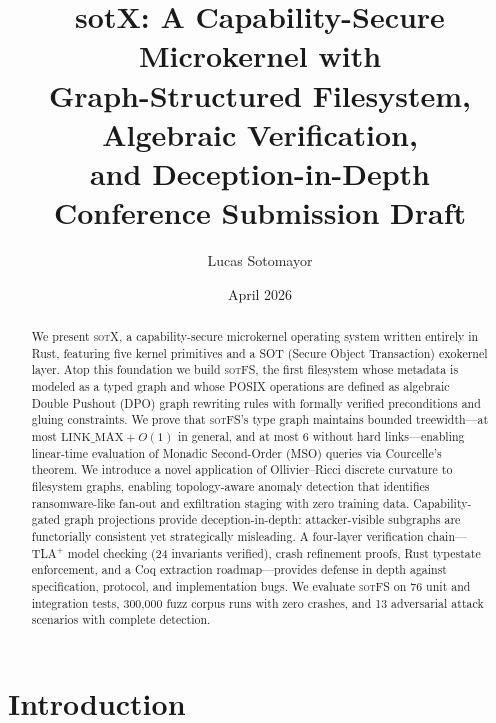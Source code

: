 \documentclass[11pt,a4paper]{article}
\title{
  \vspace{-1.5cm}
  \textbf{sotX}: A Capability-Secure Microkernel with \\
  Graph-Structured Filesystem, Algebraic Verification, \\
  and Deception-in-Depth \\[0.6em]
  \normalsize Conference Submission Draft
}
\author{
  Lucas Sotomayor
}
\date{April 2026}
\theoremstyle{definition}
\theoremstyle{remark}
\newcommand{\sotfs}{\textsc{sotFS}}
\newcommand{\sotx}{\textsc{sotX}}
\begin{document}

\maketitle
\thispagestyle{empty}

\begin{abstract}
\noindent
We present \sotx{}, a capability-secure microkernel operating system
written entirely in Rust, featuring five kernel primitives and a
SOT (Secure Object Transaction) exokernel layer. Atop this foundation
we build \sotfs{}, the first filesystem whose metadata is modeled as a
typed graph and whose POSIX operations are defined as algebraic
Double Pushout (DPO) graph rewriting rules with formally verified
preconditions and gluing constraints. We prove that \sotfs{}'s type
graph maintains bounded treewidth---at most $\mathrm{LINK\_MAX} + O(1)$
in general, and at most 6 without hard links---enabling linear-time
evaluation of Monadic Second-Order (MSO) queries via Courcelle's
theorem. We introduce a novel application of Ollivier--Ricci discrete
curvature to filesystem graphs, enabling topology-aware anomaly
detection that identifies ransomware-like fan-out and exfiltration
staging with zero training data. Capability-gated graph projections
provide deception-in-depth: attacker-visible subgraphs are functorially
consistent yet strategically misleading. A four-layer verification
chain---TLA$^+$ model checking (24 invariants verified), crash
refinement proofs, Rust typestate enforcement, and a Coq extraction
roadmap---provides defense in depth against specification, protocol,
and implementation bugs. We evaluate \sotfs{} on 76 unit and integration
tests, 300{,}000 fuzz corpus runs with zero crashes, and 13 adversarial
attack scenarios with complete detection.
\end{abstract}

\tableofcontents
\newpage

\section{Introduction}
\label{sec:intro}
\end{document}
